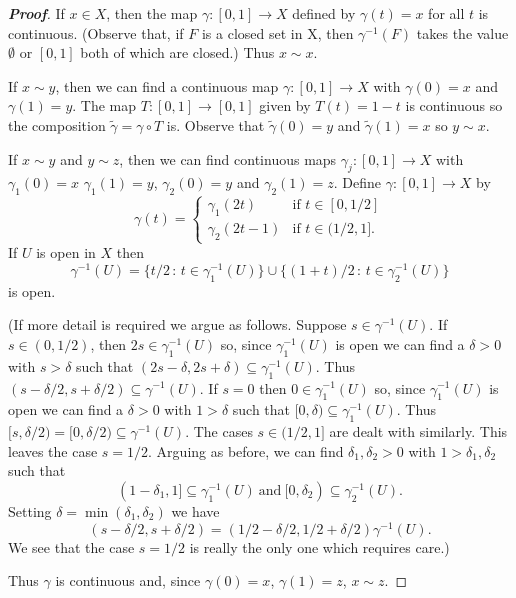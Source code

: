 \begin{proof}[\bf Proof]
If $x\in X$, then the map $\gamma:[0,1]\rightarrow X$ defined by
$\gamma(t)=x$ for all $t$ is continuous.
(Observe that, if $F$ is a closed set in X, then
$\gamma^{-1}(F)$ takes the value $\emptyset$
or $[0,1]$ both of which are closed.) Thus $x\sim x$.

If $x\sim y$, then we can find a continuous map
$\gamma:[0,1]\rightarrow X$ with $\gamma(0)=x$
and $\gamma(1)=y$. The map $T:[0,1]\rightarrow [0,1]$
given by $T(t)=1-t$ is continuous so the composition
$\tilde{\gamma}=\gamma\circ T$ is. Observe
that $\tilde{\gamma}(0)=y$ and $\tilde{\gamma}(1)=x$
so $y\sim x$.

If $x\sim y$ and $y\sim z$, then we can find  continuous maps
$\gamma_{j}:[0,1]\rightarrow X$ with $\gamma_{1}(0)=x$
$\gamma_{1}(1)=y$, $\gamma_{2}(0)=y$ and $\gamma_{2}(1)=z$.
Define $\gamma:[0,1]\rightarrow X$ by
\[
\gamma(t)=
\begin{cases}
\gamma_{1}(2t)&\text{if $t\in[0,1/2]$}\\
\gamma_{2}(2t-1)&\text{if $t\in(1/2,1]$}.
\end{cases}
\]
If $U$ is open in $X$ then
\[\gamma^{-1}(U)=\{t/2\,:\,t\in\gamma_{1}^{-1}(U)\}
\cup\{(1+t)/2\,:\,t\in\gamma_{2}^{-1}(U)\}\]
is open.

(If more detail is required we argue as follows.
Suppose $s\in\gamma^{-1}(U)$. If $s\in(0,1/2)$,
then $2s\in \gamma_{1}^{-1}(U)$ so, since $\gamma_{1}^{-1}(U)$
is open we can find a $\delta>0$ with $s>\delta$
such that $(2s-\delta,2s+\delta)\subseteq \gamma_{1}^{-1}(U)$.
Thus $(s-\delta/2,s+\delta/2)\subseteq \gamma^{-1}(U)$.
If $s=0$ then $0\in\gamma_{1}^{-1}(U)$ so, since $\gamma_{1}^{-1}(U)$
is open we can find a $\delta>0$ with $1>\delta$ such that
$[0,\delta)\subseteq \gamma_{1}^{-1}(U)$. Thus
$[s,\delta/2)=[0,\delta/2)\subseteq \gamma^{-1}(U)$.
The cases $s\in(1/2,1]$ are dealt with similarly.
This leaves the case $s=1/2$. Arguing as before, we can find
$\delta_{1},\delta_{2}>0$ with $1>\delta_{1},\delta_{2}$
such that
\[(1-\delta_{1},1]\subseteq \gamma_{1}^{-1}(U)
\ \text{and}
\ [0,\delta_{2})\subseteq \gamma_{2}^{-1}(U).\]
Setting $\delta=\min(\delta_{1},\delta_{2})$ we have
\[(s-\delta/2,s+\delta/2)=(1/2-\delta/2,1/2+\delta/2)
\gamma^{-1}(U).\]
We see that the case $s=1/2$ is really the only one which requires
care.)

Thus $\gamma$ is continuous
and, since $\gamma(0)=x$, $\gamma(1)=z$, $x\sim z$.
\end{proof}



